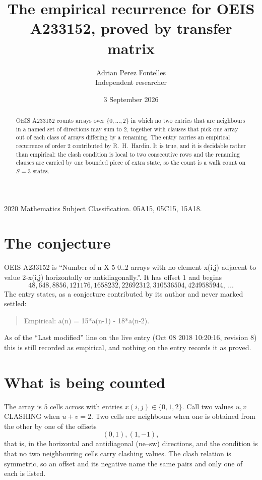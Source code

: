 \documentclass[11pt,a4paper]{article}
\title{The empirical recurrence for OEIS A233152, proved by transfer matrix}
\author{Adrian Perez Fontelles\\ \small Independent researcher}
\date{3 September 2026}
\theoremstyle{plain}
\theoremstyle{definition}
\begin{document}
\maketitle

\begin{abstract}
OEIS A233152 counts arrays over $\{0,\dots,2\}$ in which no two entries that are neighbours in
a named set of directions may sum to $2$, together with clauses that pick one array out of
each class of arrays differing by a renaming. The entry carries an empirical recurrence of
order $2$ contributed by R.~H.~Hardin. It is true, and it is decidable rather than
empirical: the clash condition is local to two consecutive rows and the renaming clauses are
carried by one bounded piece of extra state, so the count is a walk count on $S=3$ states.
\end{abstract}

\noindent\small 2020 Mathematics Subject Classification. 05A15, 05C15, 15A18.\normalsize

\section{The conjecture}

OEIS A233152 is ``Number of n X 5 0..2 arrays with no element x(i,j) adjacent to value 2-x(i,j) horizontally or antidiagonally.''. It has offset $1$ and begins
\[
48, 648, 8856, 121176, 1658232, 22692312, 310536504, 4249585944,\ \dots
\]
The entry states, as a conjecture contributed by its author and never marked settled:
\begin{quote}
Empirical: a(n) = 15*a(n-1) - 18*a(n-2).
\end{quote}
As of the ``Last modified'' line on the live entry (Oct 08 2018 10:20:16, revision 8) this is still
recorded as empirical, and nothing on the entry records it as proved.

\section{What is being counted}

The array is $5$ cells across with entries $x(i,j)\in\{0,1,2\}$. Call two values $u,v$ CLASHING
when $u+v=2$. Two cells are neighbours when one is obtained from the other by one of
the offsets
\[
(0,1), (1,-1),
\]
that is, in the horizontal and antidiagonal (ne--sw) directions, and the condition is that no two neighbouring cells carry
clashing values. The clash relation is symmetric, so an offset and its negative name the
same pairs and only one of each is listed.
\end{document}
